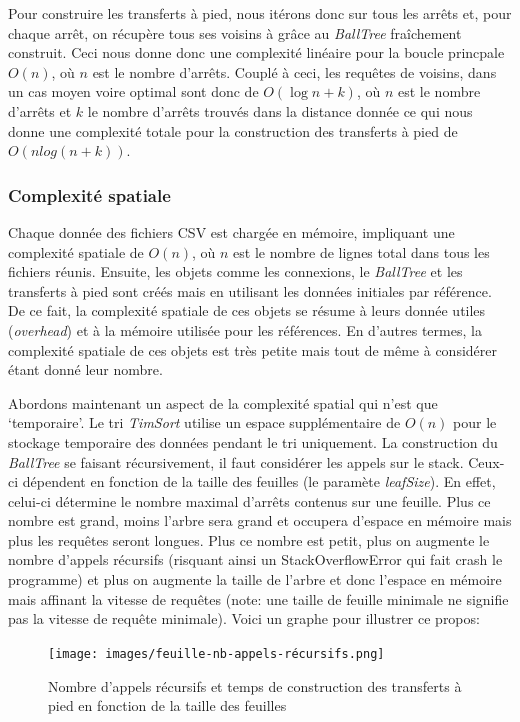 \documentclass[12pt]{article}
\begin{document}
Pour construire les transferts à pied, nous itérons donc sur tous les arrêts et, pour chaque arrêt, on récupère tous ses voisins à grâce au \emph{BallTree} fraîchement construit. Ceci nous donne donc une complexité
linéaire pour la boucle princpale $O(n)$, où $n$ est le nombre d'arrêts. Couplé à ceci, les requêtes de voisins, dans un cas moyen voire optimal sont donc de $O(\log n + k)$, où $n$ est le nombre d'arrêts 
et $k$ le nombre d'arrêts trouvés dans la distance donnée ce qui nous donne une complexité totale pour la construction des transferts à pied de $O(nlog(n + k))$.


\subsubsection{Complexité spatiale}
Chaque donnée des fichiers CSV est chargée en mémoire, impliquant une complexité spatiale de $O(n)$, où $n$ est le nombre de lignes total dans tous les fichiers réunis. Ensuite, les objets
comme les connexions, le \emph{BallTree} et les transferts à pied sont créés mais en utilisant les données initiales par référence. De ce fait, la complexité spatiale de ces objets se résume à leurs
donnée utiles (\emph{overhead}) et à la mémoire utilisée pour les références. En d'autres termes, la complexité spatiale de ces objets est très petite mais tout de même à considérer étant donné leur nombre.

Abordons maintenant un aspect de la complexité spatial qui n'est que `temporaire'. Le tri \emph{TimSort} utilise un espace supplémentaire de $O(n)$ pour le stockage temporaire des données pendant le tri uniquement.
La construction du \emph{BallTree} se faisant récursivement, il faut considérer les appels sur le stack. Ceux-ci dépendent en fonction de la taille des feuilles (le paramète \emph{leafSize}). En effet, celui-ci
détermine le nombre maximal d'arrêts contenus sur une feuille. Plus ce nombre est grand, moins l'arbre sera grand et occupera d'espace en mémoire mais plus les requêtes seront longues. Plus ce nombre est petit,
plus on augmente le nombre d'appels récursifs (risquant ainsi un StackOverflowError qui fait crash le programme) et plus on augmente la taille de l'arbre et donc l'espace en mémoire mais affinant la vitesse de
requêtes (note: une taille de feuille minimale ne signifie pas la vitesse de requête minimale). Voici un graphe pour illustrer ce propos:

\begin{figure}[h]
    \centering
    \texttt{[image: images/feuille-nb-appels-récursifs.png]}
    \caption{Nombre d'appels récursifs et temps de construction des transferts à pied en fonction de la taille des feuilles}
\end{figure}
\end{document}
